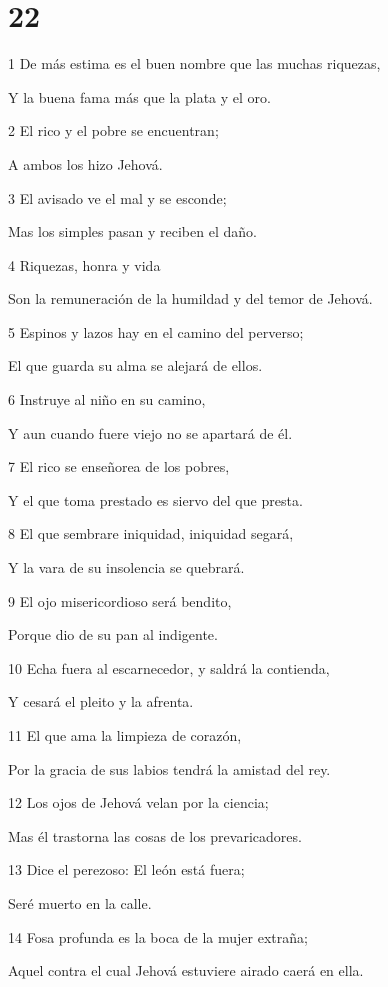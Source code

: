 \chapter{22}

\par 1 De más estima es el buen nombre que las muchas riquezas,
\par Y la buena fama más que la plata y el oro.
\par 2 El rico y el pobre se encuentran;
\par A ambos los hizo Jehová.
\par 3 El avisado ve el mal y se esconde;
\par Mas los simples pasan y reciben el daño.
\par 4 Riquezas, honra y vida
\par Son la remuneración de la humildad y del temor de Jehová.
\par 5 Espinos y lazos hay en el camino del perverso;
\par El que guarda su alma se alejará de ellos.
\par 6 Instruye al niño en su camino,
\par Y aun cuando fuere viejo no se apartará de él.
\par 7 El rico se enseñorea de los pobres,
\par Y el que toma prestado es siervo del que presta.
\par 8 El que sembrare iniquidad, iniquidad segará,
\par Y la vara de su insolencia se quebrará.
\par 9 El ojo misericordioso será bendito,
\par Porque dio de su pan al indigente.
\par 10 Echa fuera al escarnecedor, y saldrá la contienda,
\par Y cesará el pleito y la afrenta.
\par 11 El que ama la limpieza de corazón,
\par Por la gracia de sus labios tendrá la amistad del rey.
\par 12 Los ojos de Jehová velan por la ciencia;
\par Mas él trastorna las cosas de los prevaricadores.
\par 13 Dice el perezoso: El león está fuera;
\par Seré muerto en la calle.
\par 14 Fosa profunda es la boca de la mujer extraña;
\par Aquel contra el cual Jehová estuviere airado caerá en ella.
